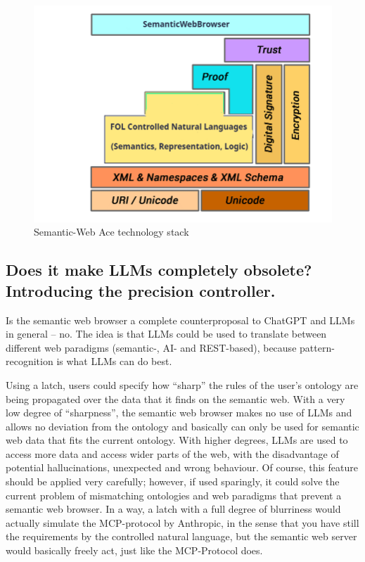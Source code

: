 \documentclass[12pt,a4paper]{article}
\begin{document}
\begin{figure}[h]
    \includegraphics[width=12cm]{Semantic-Web-technology-ace-stack}
    \caption{Semantic-Web Ace technology stack}
\end{figure}

\subsection{Does it make LLMs completely obsolete? Introducing the precision controller.}

Is the semantic web browser a complete counterproposal to ChatGPT and LLMs in general -- no. The idea is that LLMs could be used to translate between different web paradigms (semantic-, AI- and REST-based), because pattern-recognition is what LLMs can do best.

Using a latch, users could specify how ``sharp'' the rules of the user's ontology are being propagated over the data that it finds on the semantic web. With a very low degree of ``sharpness'', the semantic web browser makes no use of LLMs and allows no deviation from the ontology and basically can only be used for semantic web data that fits the current ontology. With higher degrees, LLMs are used to access more data and access wider parts of the web, with the disadvantage of potential hallucinations, unexpected and wrong behaviour. Of course, this feature should be applied very carefully; however, if used sparingly, it could solve the current problem of mismatching ontologies and web paradigms that prevent a semantic web browser. In a way, a latch with a full degree of blurriness would actually simulate the MCP-protocol by Anthropic, in the sense that you have still the requirements by the controlled natural language, but the semantic web server would basically freely act, just like the MCP-Protocol does.
\end{document}
